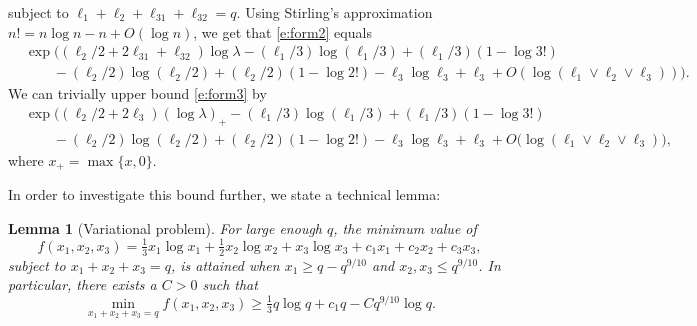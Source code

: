 \documentclass[bj,authoryear,noshowframe]{imsart}
\numberwithin{equation}{section}
\theoremstyle{plain}
\newtheorem{lem}[thm]{Lemma}
\theoremstyle{definition}
\begin{document}
subject to $\ell_1+\ell_2+\ell_{31}+\ell_{32}=q$. Using Stirling's approximation $n! = n\log{n}-n+O(\log{n})$, we get that \eqref{e:form2} equals
	\begin{equation}
	\label{e:form3}
	\begin{aligned}
	&\exp\Big((\ell_2/2 + 2\ell_{31} + \ell_{32})\log\lambda - (\ell_1/3)\log(\ell_1/3) + (\ell_1/3)(1-\log{3!})\\
	&\qquad - (\ell_2/2) \log(\ell_2/2) + (\ell_2/2)(1-\log{2!}) - \ell_3\log{\ell_3} + \ell_3 + O(\log(\ell_1\vee \ell_2 \vee \ell_3))\Big).
	\end{aligned}
	\end{equation}
We can trivially upper bound \eqref{e:form3} by
	\begin{equation}
	\label{pen-final-bound-UB}
	\begin{aligned}
	&\exp\Big((\ell_2/2 + 2\ell_{3}) (\log\lambda)_+ - (\ell_1/3) \log(\ell_1/3) + (\ell_1/3) (1-\log{3!})\\
	&\qquad - (\ell_2/2)\log(\ell_2/2) + (\ell_2/2) (1-\log{2!})- \ell_3\log{\ell_3}  + \ell_3 + O(\log(\ell_1\vee \ell_2 \vee \ell_3)\Big),
	\end{aligned}
	\end{equation}
where $x_+=\max\{x,0\}$.

In order to investigate this bound further, we state a technical lemma:

\begin{lem}[Variational problem]
\label{lem:thudec1402pm}
For large enough $q$, the minimum value of 
	\begin{equation}
	f(x_1,x_2,x_3) = \tfrac13 x_1 \log{x_1} + \tfrac12 x_2 \log{x_2} + x_3 \log{x_3} 
	+ c_1x_1+c_2x_2+c_3x_3,
	\end{equation}
subject to $x_1+x_2+x_3=q$, is attained when $x_1 \geq q-q^{9/10}$ and $x_2, x_3 \leq q^{9/10}$. In particular, there exists a $C>0$ such that
	\begin{equation}
	\min_{x_1+x_2+x_3=q}f(x_1,x_2,x_3) \geq  \tfrac13 q\log{q}+ c_1q- Cq^{9/10}\log{q}.
	\end{equation}
\end{lem}
\end{document}

